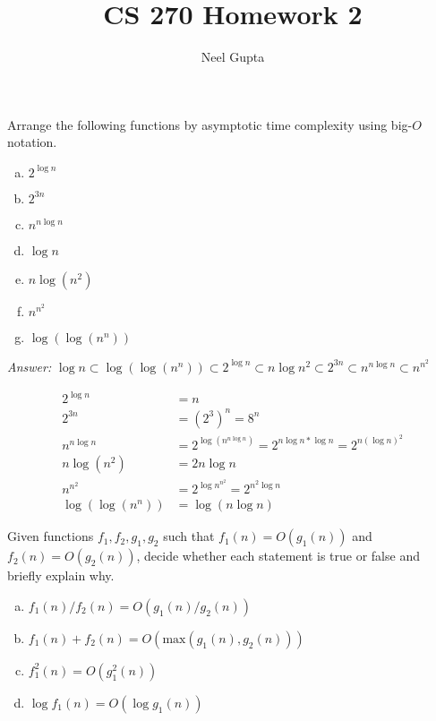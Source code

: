 \documentclass[12pt]{article}
\newenvironment{problem}[2][Problem]{\begin{trivlist}
\item[\hskip \labelsep {\bfseries #1}\hskip \labelsep {\bfseries #2.}]}{\end{trivlist}}
\begin{document}

\title{\vspace{-4.5cm}CS 270 Homework 2}
\author{Neel Gupta} 
\maketitle 
\begin{problem}{1}
Arrange the following functions by asymptotic time complexity using big-$O$ notation.
\begin{enumerate}[a)]
	\item $2^{\log n}$
	\item $2^{3n}$
	\item $n^{n\log n}$
	\item $\log n$
	\item $n\log(n^2)$
	\item $n^{n^2}$
	\item $\log(\log(n^n))$
\end{enumerate}
\end{problem}

\textit{Answer: } $\log n \subset \log(\log (n^n)) \subset 2^{\log n} \subset n \log n^2 \subset 2^{3n} \subset n^{n\log n} \subset n^{n^2}$

\begin{align*}
2^{\log n} &= n \\
2^{3n} &= (2^3)^n = 8^n\\
n^{n\log n} &= 2^{\log(n^{n\log n})} = 2^{{n\log n}*\log n} = 2^{n(\log n)^2}\\
n\log(n^2) &= 2n\log n\\
n^{n^2} &= 2^{\log n^{n^2}} = 2^{n^2\log n}\\
\log(\log(n^n)) &= \log(n\log n)
\end{align*}

\begin{problem}{2}
Given functions $f_1, f_2, g_1, g_2$ such that $f_1(n)=O(g_1(n))$ and $f_2(n)=O(g_2(n))$, decide whether each statement is true or false and briefly explain why.
\begin{enumerate}[a)]
	\item $f_1(n)/f_2(n) = O(g_1(n)/g_2(n))$
	\item $f_1(n)+f_2(n) = O(\text{max}(g_1(n), g_2(n)))$
	\item $f_1^2(n) = O(g_1^2(n))$
	\item $\log f_1(n) = O(\log g_1(n))$
\end{enumerate}
\end{problem}
\end{document}
